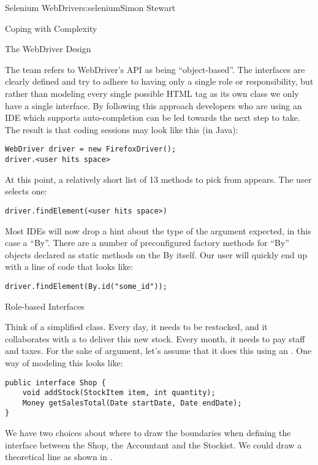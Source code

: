 \begin{aosachapter}{Selenium WebDriver}{s:selenium}{Simon Stewart}
\begin{aosasect1}{Coping with Complexity}
\begin{aosasect2}{The WebDriver Design}

The team refers to WebDriver's API as being ``object-based''. The
interfaces are clearly defined and try to adhere to having only a
single role or responsibility, but rather than modeling every single
possible HTML tag as its own class we only have a single
 interface. By following this approach developers
who are using an IDE which supports auto-completion can be led towards
the next step to take. The result is that coding sessions may
look like this (in Java):

\begin{verbatim}
WebDriver driver = new FirefoxDriver();
driver.<user hits space>
\end{verbatim}

\noindent At this point, a relatively short list of 13 methods to pick from
appears. The user selects one:

\begin{verbatim}
driver.findElement(<user hits space>)
\end{verbatim}

\noindent Most IDEs will now drop a hint about the type of the argument
expected, in this case a ``By''. There are a number of preconfigured
factory methods for ``By'' objects declared as static methods on the
By itself. Our user will quickly end up with a line of code that looks
like:

\begin{verbatim}
driver.findElement(By.id("some_id"));
\end{verbatim}

\begin{aosabox}{Role-based Interfaces}

Think of a simplified  class. Every day, it needs to be
restocked, and it collaborates with a  to deliver this
new stock. Every month, it needs to pay staff and taxes. For the sake
of argument, let's assume that it does this using an
. One way of modeling this looks like:

\begin{verbatim}
public interface Shop {
    void addStock(StockItem item, int quantity);
    Money getSalesTotal(Date startDate, Date endDate);
}
\end{verbatim}

We have two choices about where to draw the boundaries when defining
the interface between the Shop, the Accountant and the Stockist. We
could draw a theoretical line as shown in .


\end{aosabox}
\end{aosasect2}
\end{aosasect1}
\end{aosachapter}
